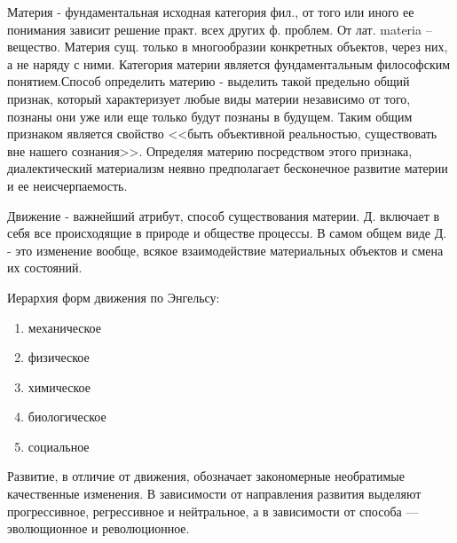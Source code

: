Материя - фундаментальная исходная категория фил., от того или иного ее понимания зависит решение практ. всех других ф. проблем. От лат. materia – вещество. Материя сущ. только в многообразии конкретных объектов, через них, а не наряду с ними. Категория материи является фундаментальным философским понятием.Способ определить материю - выделить такой предельно общий признак, который характеризует любые виды материи независимо от того, познаны они уже или еще только будут познаны в будущем. Таким общим признаком является свойство <<быть объективной реальностью, существовать вне нашего сознания>>. Определяя материю посредством этого признака, диалектический материализм неявно
предполагает бесконечное развитие материи и ее неисчерпаемость.

Движение - важнейший атрибут, способ существования материи. Д. включает в себя все происходящие в природе и обществе процессы. В самом общем виде Д. - это изменение вообще, всякое взаимодействие материальных объектов и смена их состояний.

Иерархия форм движения по Энгельсу:
\begin{enumerate}
    \item механическое
    \item физическое
    \item химическое
    \item биологическое
    \item социальное
\end{enumerate}

Развитие, в отличие от движения, обозначает закономерные необратимые качественные изменения. В зависимости от направления развития выделяют прогрессивное, регрессивное и нейтральное, а в зависимости от способа --- эволющионное и революционное.